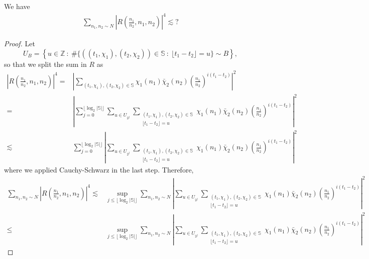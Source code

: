 \begin{lemma}
    We have \begin{align*}
        \sum_{n_1,n_2\sim N}\left|R\left(\frac{n_1}{n_2},n_1,n_2\right) \right|^4\lesssim ?
    \end{align*}
\end{lemma}
\begin{proof}
    Let \[
    U_B=\left\{u\in\mathbb{Z} \ : \ \#\{((t_1,\chi_1),(t_2,\chi_2))\in \mathbb{S} \ : \ \lfloor {t_1-t_2}\rfloor = u \} \sim B \right\},
    \]
    so that we split the sum in $R$ as \begin{align*}
        \left|R\left(\frac{n_1}{n_2} ,n_1,n_2\right) \right|^4 =&
        \left|
        \sum_{(t_1,\chi_1),(t_2,\chi_2)\in \mathbb{S}}
        \chi_1(n_1)\bar{\chi}_2(n_2) \left(\frac{n_1}{n_2}\right)^{i(t_1-t_2)}\right|^2 \\
        =& \left|
        \sum_{j=0}^{ \lfloor \log_2 |\mathbb{S}|\rfloor} \sum_{u\in U_{2^j}}\sum_{\substack{(t_1,\chi_1),(t_2,\chi_2)\in \mathbb{S}\\ \lfloor t_1-t_2 \rfloor = u}} 
        \chi_1(n_1)\bar{\chi}_2(n_2) \left(\frac{n_1}{n_2}\right)^{i(t_1-t_2)}\right|^2\\
        \lesssim& \sum_{j=0}^{ \lfloor \log_2 |\mathbb{S}|\rfloor} \left|
         \sum_{u\in U_{2^j}}\sum_{\substack{(t_1,\chi_1),(t_2,\chi_2)\in \mathbb{S}\\ \lfloor t_1-t_2 \rfloor = u}} 
        \chi_1(n_1)\bar{\chi}_2(n_2) \left(\frac{n_1}{n_2}\right)^{i(t_1-t_2)}\right|^2
    \end{align*}
    where we applied Cauchy-Schwarz in the last step.
    Therefore, \begin{align*}
        \sum_{n_1,n_2\sim N}\left|R\left(\frac{n_1}{n_2},n_1,n_2\right) \right|^4 \lesssim & 
        \sup_{j\leq \lfloor \log_2 |\mathbb{S}|\rfloor} \sum_{n_1,n_2\sim N} \left|
        \sum_{u\in U_{2^j}}\sum_{\substack{(t_1,\chi_1),(t_2,\chi_2)\in \mathbb{S}\\ \lfloor t_1-t_2 \rfloor = u}} 
       \chi_1(n_1)\bar{\chi}_2(n_2) \left(\frac{n_1}{n_2}\right)^{i(t_1-t_2)}\right|^2\\
       \leq& \sup_{j\leq \lfloor \log_2 |\mathbb{S}|\rfloor} \sum_{n_1,n_2\sim N} \left|
       \sum_{u\in U_{2^j}}\sum_{\substack{(t_1,\chi_1),(t_2,\chi_2)\in \mathbb{S}\\ \lfloor t_1-t_2 \rfloor = u}} 
      \chi_1(n_1)\bar{\chi}_2(n_2) \left(\frac{n_1}{n_2}\right)^{i(t_1-t_2)}\right|^2
    \end{align*}
\end{proof}